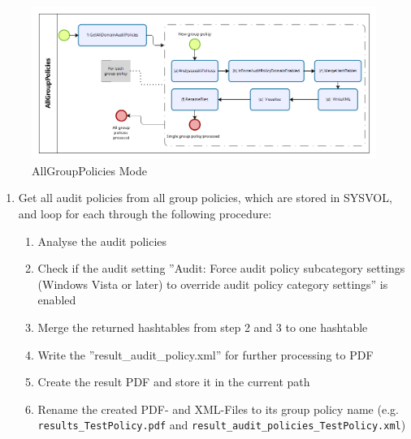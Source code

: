 \begin{figure}[H]
    \centering
    \includegraphics[width=1\linewidth]{assets/modes/allgrouppolicies.png}
    \caption{AllGroupPolicies Mode}
\end{figure}
\begin{enumerate}
    \item Get all audit policies from all group policies, which are stored in SYSVOL, and loop for each through the following procedure:
    \begin{enumerate}
        \item Analyse the audit policies
        \item Check if the audit setting ''Audit: Force audit policy subcategory settings (Windows Vista or later) to override audit policy category settings'' is enabled
        \item Merge the returned hashtables from step 2 and 3 to one hashtable
        \item Write the ''result\_audit\_policy.xml'' for further processing to PDF
        \item Create the result PDF and store it in the current path
        \item Rename the created PDF- and XML-Files to its group policy name (e.g. \lstinline|results_TestPolicy.pdf| and \lstinline|result_audit_policies_TestPolicy.xml|)
    \end{enumerate}
\end{enumerate}